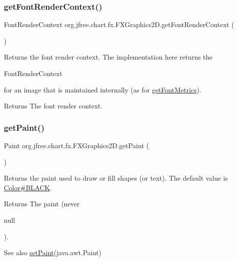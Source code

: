 \subsubsection{\texorpdfstring{get\+Font\+Render\+Context()}{getFontRenderContext()}}
{\footnotesize\ttfamily Font\+Render\+Context org.\+jfree.\+chart.\+fx.\+F\+X\+Graphics2\+D.\+get\+Font\+Render\+Context (\begin{DoxyParamCaption}{ }\end{DoxyParamCaption})}

Returns the font render context. The implementation here returns the 
\begin{DoxyCode}
FontRenderContext 
\end{DoxyCode}
 for an image that is maintained internally (as for \mbox{\hyperlink{classorg_1_1jfree_1_1chart_1_1fx_1_1_f_x_graphics2_d_a59cf49af7fa02e82c05cb2f76d4ed0b5}{get\+Font\+Metrics}}).

\begin{DoxyReturn}{Returns}
The font render context. 
\end{DoxyReturn}
\mbox{\label{classorg_1_1jfree_1_1chart_1_1fx_1_1_f_x_graphics2_d_a67325fdaf847a6daf0d98da1771f5638}} 
\subsubsection{\texorpdfstring{get\+Paint()}{getPaint()}}
{\footnotesize\ttfamily Paint org.\+jfree.\+chart.\+fx.\+F\+X\+Graphics2\+D.\+get\+Paint (\begin{DoxyParamCaption}{ }\end{DoxyParamCaption})}

Returns the paint used to draw or fill shapes (or text). The default value is \mbox{\hyperlink{}{Color\#\+B\+L\+A\+CK}}.

\begin{DoxyReturn}{Returns}
The paint (never
\begin{DoxyCode}
null 
\end{DoxyCode}
 ).
\end{DoxyReturn}
\begin{DoxySeeAlso}{See also}
\mbox{\hyperlink{classorg_1_1jfree_1_1chart_1_1fx_1_1_f_x_graphics2_d_adad6db25635ffeb6e5684c12d2ca03aa}{set\+Paint}}(java.\+awt.\+Paint) 
\end{DoxySeeAlso}
\mbox{\label{classorg_1_1jfree_1_1chart_1_1fx_1_1_f_x_graphics2_d_afa793efe72f1ae21a3c9b9c10927ca31}} 
